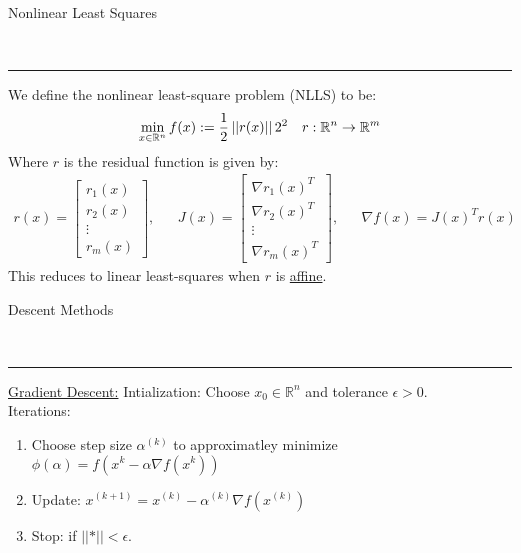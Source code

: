 \documentclass{article}
\newcommand{\header}[1]{\begin{large}\noindent #1\end{large}\\\rule{\textwidth}{0.5pt}}
\newcommand{\norm}[2]{\left\lvert\left\lvert#1\right\rvert\right\rvert}
\newcommand{\sheader}[1]{\underline{#1:}}
\newcommand{\gap}{\medskip\\}
\newcommand{\ds}{\displaystyle}
\begin{document}
\header{Nonlinear Least Squares}
We define the nonlinear least-square problem (NLLS) to be:
\begin{align*}
    \min_{x\in \mathbb{R}^n} f(x) := \frac{1}{2}\norm{r(x)}_2^2 && r: \mathbb{R}^n \to \mathbb{R}^m
\end{align*}
Where $r$ is the residual function is given by:
\begin{align*}
    r(x) = \begin{bmatrix}
        r_1(x)\\
        r_2(x)\\
        \vdots \\
        r_m(x)
    \end{bmatrix}, &&
    J(x) = \begin{bmatrix}
        \nabla r_1(x)^T\\
        \nabla r_2(x)^T\\
        \vdots\\
        \nabla r_m(x)^T
    \end{bmatrix},
    &&
    \nabla f(x) = J(x)^T r(x)
\end{align*}
This reduces to linear least-squares when $r$ is \underline{affine}.
\gap
\header{Descent Methods}
\sheader{Gradient Descent}
Intialization: Choose $x_0 \in \mathbb{R}^n$ and tolerance $\epsilon > 0$.\\
Iterations:
\begin{enumerate}
    \item Choose step size $\alpha^{(k)}$ to approximatley minimize $\ds \phi(\alpha) = f(x^k - \alpha \nabla f(x^k))$
    \item Update: $x^{(k + 1)} = x^{(k)} - \alpha^{(k)}\nabla f(x^{(k)})$
    \item Stop: if $\norm*{\nabla f(x^{(k)})} < \epsilon$.
\end{enumerate}
\end{document}
